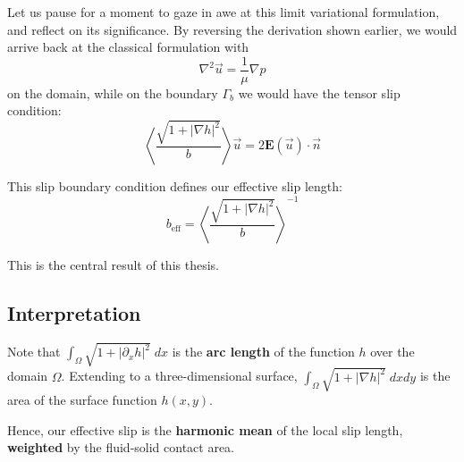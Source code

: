 \documentclass[a4paper]{report}
\newcommand{\beff}{\ensuremath{b_{\mathrm{eff}}}}
\begin{document}
Let us pause for a moment to gaze in awe at this limit variational formulation, and reflect on its significance.  By reversing the derivation shown earlier,
 we would arrive back at the classical formulation with
\begin{equation}
\nabla^2 \vec{u} = \frac{1}{\mu} \nabla p
\end{equation}
on the domain, while on the boundary $\Gamma_b$ we would have the tensor slip condition:
\begin{equation}
\left< \frac{\sqrt{1 + \lvert \nabla h \rvert^2}}{b} \right> \vec{u} = 2 \mathbf{E}(\vec{u}) \cdot \vec{n}
\end{equation}

This slip boundary condition defines our effective slip length:
\begin{equation}
\beff = \left< \frac{\sqrt{1 + \lvert \nabla h \rvert^2}}{b} \right> ^{-1}
\end{equation}

This is the central result of this thesis.

\subsection*{Interpretation}
Note that $\int_{\Omega} \sqrt{1 + \lvert \partial_x h \rvert^2} \; dx$ is the \textbf{arc length} of the function $h$ over the domain $\Omega$.  Extending to a three-dimensional surface,  $\int_{\Omega} \sqrt{1 + \lvert \nabla h \rvert^2} \; dxdy$ is the area of the surface function $h(x,y)$.

Hence, our effective slip is the \textbf{harmonic mean} of the local slip length, \textbf{weighted} by the fluid-solid contact area.


\begin{center}
\end{center}
\end{document}
